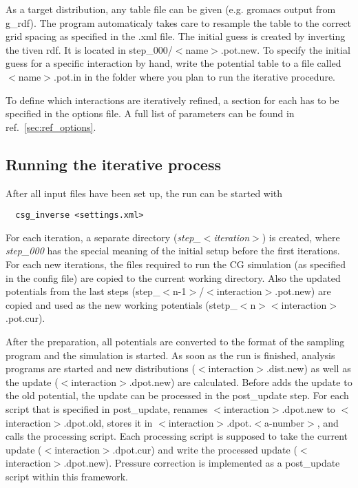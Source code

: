 As a target distribution, any table file can be given (e.g. gromacs output from g\_rdf). The program automaticaly takes care to resample the table to the correct grid spacing as specified in the .xml file.
The initial guess is created by inverting the tiven rdf. It is located in step\_000/$<$name$>$.pot.new. To specify the initial guess for a specific interaction by hand, write the potential table to a file called $<$name$>$.pot.in in the folder where you plan to run the iterative procedure.

To define which interactions are iteratively refined, a section for each has to be specified in the options file. A full list of parameters can be found in ref.~\ref{sec:ref_options}.

\subsection{Running the iterative process}
After all input files have been set up, the run can be started with
\begin{verbatim}
  csg_inverse <settings.xml>
\end{verbatim}

For each iteration, a separate directory (\textit{step\_$<$iteration$>$}) is created, where \textit{step\_000} has the special meaning of the initial setup before the first iterations. For each new iterations, the files required to run the CG simulation (as specified in the config file) are copied to the current working directory. Also the updated potentials from the last steps (step\_$<$n-1$>$/$<$interaction$>$.pot.new) are copied and used as the new working potentials (stetp\_$<$n$>$\/$<$interaction$>$.pot.cur).

After the preparation, all potentials are converted to the format of the sampling program and the simulation is started. As soon as the run is finished, analysis programs are started and new distributions ($<$interaction$>$.dist.new) as well as the update ($<$interaction$>$.dpot.new) are calculated. Before \votca adds the update to the old potential, the update can be processed in the post\_update step. For each script that is specified in post\_update, \votca renames $<$interaction$>$.dpot.new to $<$interaction$>$.dpot.old, stores it in $<$interaction$>$.dpot.$<$a-number$>$, and calls the processing script. Each processing script is supposed to take the current update ($<$interaction$>$.dpot.cur) and write the processed update ($<$interaction$>$.dpot.new). Pressure correction is implemented as a post\_update script within this framework.


